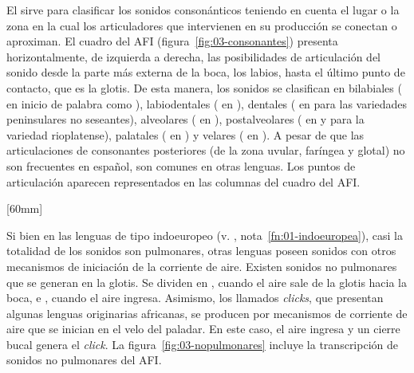 El  sirve para clasificar los sonidos
consonánticos teniendo en cuenta el lugar o la zona en la cual los articuladores
que intervienen en su producción se conectan o aproximan. El cuadro del AFI
(figura~\ref{fig:03-consonantes}) presenta horizontalmente, de izquierda a
derecha, las posibilidades de articulación del sonido desde la parte más
externa de la boca, los labios, hasta el último punto de contacto, que es la
glotis. De esta manera, los sonidos se clasifican en bilabiales ( en
inicio de palabra como ), labiodentales ( en
), dentales ( en  para las
variedades peninsulares no seseantes), alveolares ( en
), postalveolares ( en  y 
para la variedad rioplatense), palatales ( en ) y
velares ( en ). A pesar de que las articulaciones
de consonantes posteriores (de la zona uvular, faríngea y glotal) no son
frecuentes en español, son comunes en otras lenguas. Los puntos de articulación
aparecen representados en las columnas del cuadro del AFI.

[60mm]

\begin{recuadro}
Si bien en las lenguas de tipo indoeuropeo (v. , nota~\ref{fn:01-indoeuropea}),
casi la totalidad de los sonidos son pulmonares, otras lenguas poseen sonidos
con otros mecanismos de iniciación de la corriente de aire. Existen sonidos no
pulmonares que se generan en la glotis. Se dividen en ,
cuando el aire sale de la glotis hacia la boca, e , cuando
el aire ingresa. Asimismo, los llamados \textit{clicks}, que presentan algunas
lenguas originarias africanas, se producen por mecanismos de corriente de aire
que se inician en el velo del paladar. En este caso, el aire ingresa y un cierre
bucal genera el \textit{click}. La figura~\ref{fig:03-nopulmonares} incluye la
transcripción de sonidos no pulmonares del AFI.
\end{recuadro}


